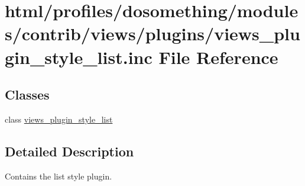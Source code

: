\hypertarget{views__plugin__style__list_8inc}{
\section{html/profiles/dosomething/modules/contrib/views/plugins/views\_\-plugin\_\-style\_\-list.inc File Reference}
\label{views__plugin__style__list_8inc}
}
\subsection*{Classes}
\begin{DoxyCompactItemize}
\item 
class \hyperlink{classviews__plugin__style__list}{views\_\-plugin\_\-style\_\-list}
\end{DoxyCompactItemize}


\subsection{Detailed Description}
Contains the list style plugin. 
